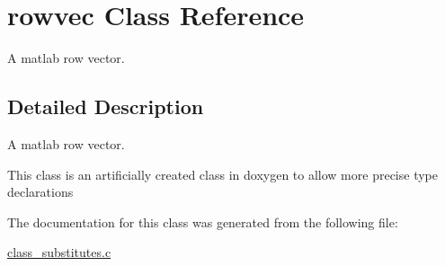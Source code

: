\hypertarget{a00011}{\section{rowvec Class Reference}
\label{a00011}
}


A matlab row vector.  




\subsection{Detailed Description}
A matlab row vector. 

This class is an artificially created class in doxygen to allow more precise type declarations 

The documentation for this class was generated from the following file\-:\begin{DoxyCompactItemize}
\item 
\hyperlink{a00016}{class\-\_\-substitutes.\-c}\end{DoxyCompactItemize}
